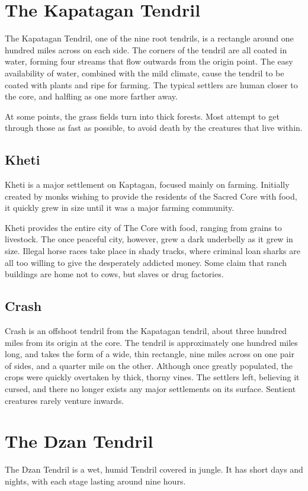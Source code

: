 \begin{multicols}{2}
\section{The Kapatagan Tendril}
The Kapatagan Tendril, one of the nine root tendrils, is a rectangle around one hundred miles across on each side.
The corners of the tendril are all coated in water, forming four streams that flow outwards from the origin point.
The easy availability of water, combined with the mild climate, cause the tendril to be coated with plants and ripe for farming.
The typical settlers are human closer to the core, and halfling as one more farther away. 

At some points, the grass fields turn into thick forests.
Most attempt to get through those as fast as possible, to avoid death by the creatures that live within.

\subsection{Kheti}
Kheti is a major settlement on Kaptagan, focused mainly on farming.
Initially created by monks wishing to provide the residents of the Sacred Core with food, it quickly grew in size until it was a major farming community.

Kheti provides the entire city of The Core with food, ranging from grains to livestock.
The once peaceful city, however, grew a dark underbelly as it grew in size.
Illegal horse races take place in shady tracks, where criminal loan sharks are all too willing to give the desperately addicted money.
Some claim that ranch buildings are home not to cows, but slaves or drug factories.

\subsection{Crash}
Crash is an offshoot tendril from the Kapatagan tendril, about three hundred miles from its origin at the core.
The tendril is approximately one hundred miles long, and takes the form of a wide, thin rectangle, nine miles across on one pair of sides, and a quarter mile on the other.
Although once greatly populated, the crops were quickly overtaken by thick, thorny vines.
The settlers left, believing it cursed, and there no longer exists any major settlements on its surface.
Sentient creatures rarely venture inwards.

\section{The Dzan Tendril}
The Dzan Tendril is a wet, humid Tendril covered in jungle.
It has short days and nights, with each stage lasting around nine hours.


\end{multicols}
